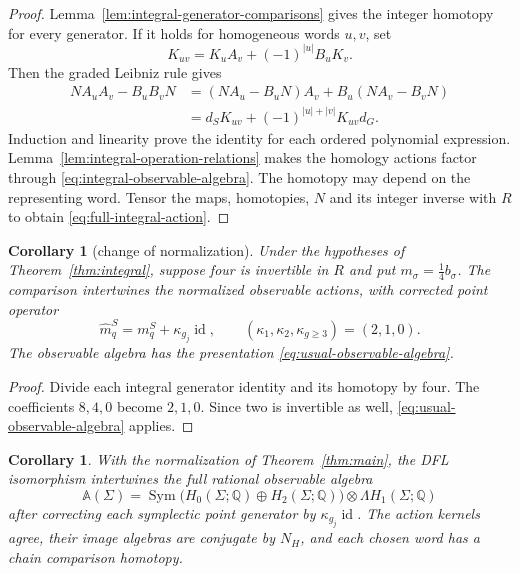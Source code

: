 \documentclass[11pt]{amsart}
\newtheorem{corollary}[theorem]{Corollary}
\theoremstyle{definition}
\theoremstyle{remark}
\theoremstyle{plain}
\newcommand{\id}{\operatorname{id}}
\begin{document}
\begin{proof}
Lemma~\ref{lem:integral-generator-comparisons}
gives the integer homotopy for every generator.
If it holds for homogeneous words $u,v$, set
\begin{equation}\label{eq:product-homotopy}
                 K_{uv}=K_uA_v+(-1)^{|u|}B_uK_v.
\end{equation}
Then the graded Leibniz rule gives
\begin{align*}
 NA_uA_v-B_uB_vN
 &=(NA_u-B_uN)A_v+B_u(NA_v-B_vN)\\
 &=d_SK_{uv}+(-1)^{|u|+|v|}K_{uv}d_G.
\end{align*}
Induction and linearity prove the identity for
each ordered polynomial expression.
Lemma~\ref{lem:integral-operation-relations}
makes the homology actions factor through
\eqref{eq:integral-observable-algebra}.
The homotopy may depend on the representing
word. Tensor the maps, homotopies, $N$ and
its integer inverse with $R$ to obtain
\eqref{eq:full-integral-action}.
\end{proof}

\begin{corollary}[change of normalization]
\label{cor:full-quarter-operation-algebra}
Under the hypotheses of Theorem~\ref{thm:integral},
suppose four is invertible in $R$ and put
$m_\sigma=\frac14b_\sigma$. The comparison
intertwines the normalized observable actions,
with corrected point operator
\begin{equation}\label{eq:quarter-corrected-point}
 \widehat m_q^S=m_q^S+\kappa_{g_j}\id,\qquad
       (\kappa_1,\kappa_2,\kappa_{g\geq3})=(2,1,0).
\end{equation}
The observable algebra has the presentation
\eqref{eq:usual-observable-algebra}.
\end{corollary}

\begin{proof}
Divide each integral generator identity and its
homotopy by four. The coefficients $8,4,0$
become $2,1,0$. Since two is invertible as well,
\eqref{eq:usual-observable-algebra} applies.
\end{proof}

\begin{corollary}\label{cor:full-rational-observable-action}
With the normalization of Theorem~\ref{thm:main},
the DFL isomorphism intertwines the full rational
observable algebra
\[
 \mathbb A(\Sigma)=
 \operatorname{Sym}\bigl(H_0(\Sigma;\mathbb Q)
                 \oplus H_2(\Sigma;\mathbb Q)\bigr)
                         \otimes\Lambda H_1(\Sigma;\mathbb Q)
\]
after correcting each symplectic point generator
by $\kappa_{g_j}\id$. The action kernels agree,
their image algebras are conjugate by $N_H$,
and each chosen word has a chain comparison homotopy.
\end{corollary}
\end{document}
